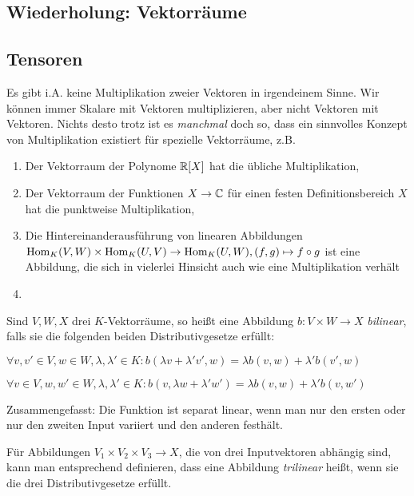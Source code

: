 
\subsection{Wiederholung: Vektorräume}


\subsection{Tensoren}

\begin{remark}
Es gibt i.A. keine Multiplikation zweier Vektoren in irgendeinem Sinne. Wir können immer Skalare mit Vektoren multiplizieren, aber nicht Vektoren mit Vektoren. Nichts desto trotz ist es \emph{manchmal} doch so, dass ein sinnvolles Konzept von Multiplikation existiert für spezielle Vektorräume, z.B.
\begin{enumerate}
	\item Der Vektorraum der Polynome $\mathbb{R}[X]$ hat die übliche Multiplikation,
	\item Der Vektorraum der Funktionen $X\to\mathbb{C}$ für einen festen Definitionsbereich $X$ hat die punktweise Multiplikation,
	\item Die Hintereinanderausführung von linearen Abbildungen $\operatorname{Hom}_K(V,W) \times \operatorname{Hom}_K(U,V) \to \operatorname{Hom}_K(U,W), (f,g) \mapsto f\circ g$ ist eine Abbildung, die sich in vielerlei Hinsicht auch wie eine Multiplikation verhält
	\item 
\end{enumerate}

\end{remark}

\begin{definition}
Sind $V,W,X$ drei $K$-Vektorräume, so heißt eine Abbildung $b: V\times W\to X$ \emph{bilinear}, falls sie die folgenden beiden Distributivgesetze erfüllt:
\begin{description}
	\item $\forall v,v'\in V, w\in W, \lambda,\lambda'\in K: b(\lambda v+ \lambda' v', w) = \lambda b(v,w) + \lambda' b(v',w)$
	\item $\forall v\in V,  w,w'\in W, \lambda,\lambda'\in K: b(v,\lambda w+\lambda'w') = \lambda b(v,w) + \lambda' b(v,w')$
\end{description}
Zusammengefasst: Die Funktion ist separat linear, wenn man nur den ersten oder nur den zweiten Input variiert und den anderen festhält.

Für Abbildungen $V_1\times V_2\times V_3\to X$, die von drei Inputvektoren abhängig sind, kann man entsprechend definieren, dass eine Abbildung \emph{trilinear} heißt, wenn sie die drei Distributivgesetze erfüllt.
\end{definition}

